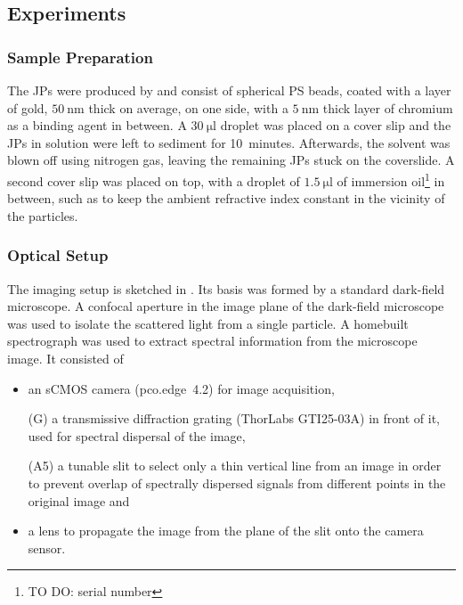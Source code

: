 \documentclass[10pt]{article}
\newcommand{\reffig}[2]{\mbox{\sffamily{Figure \ref{#1}#2}}}
\begin{document}
\begin{multicols}{2}
\subsection*{Experiments}

\subsubsection*{Sample Preparation}

The JPs were produced by  and consist of spherical PS beads, coated with a layer of gold, $\SI{50}{\nano\meter}$ thick on average, on one side, with a $\SI{5}{\nano\meter}$ thick layer of chromium as a binding agent in between. 
A $\SI{30}{\micro\litre}$ droplet was placed on a cover slip and the JPs in solution were left to sediment for \mbox{10 minutes}. 
Afterwards, the solvent was blown off using nitrogen gas, leaving the remaining JPs stuck on the coverslide. 
A second cover slip was placed on top, with a droplet of $\SI{1.5}{\micro\litre}$ of immersion oil\footnote{TO DO: serial number} in between, such as to keep the ambient refractive index constant in the vicinity of the particles.   

\subsubsection*{Optical Setup}

The imaging setup is sketched in \reffig{fig:setup}{C}. 
Its basis was formed by a standard dark-field microscope. 
A confocal aperture in the image plane of the dark-field microscope was used to isolate the scattered light from a single particle. 
A homebuilt spectrograph was used to extract spectral information from the microscope image. 
It consisted of 
\begin{itemize}
    \item an sCMOS camera \mbox{\sffamily(pco.edge 4.2)} for image acquisition, 
    \item[{\sffamily(G)}] a transmissive diffraction grating {\sffamily(ThorLabs GTI25-03A)} in front of it, used for spectral dispersal of the image,
    \item[{\sffamily(A5)}] a tunable slit to select only a thin vertical line from an image in order to prevent overlap of spectrally dispersed signals from different points in the original image and
    \item a lens to propagate the image from the plane of the slit onto the camera sensor.  
\end{itemize}


\end{multicols}
\end{document}

